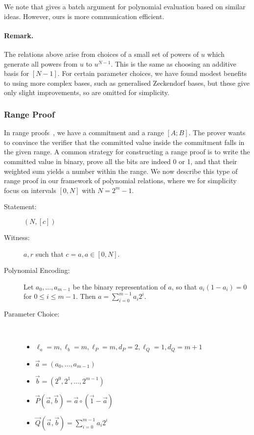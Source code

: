 We note that \cite{Bayer2014} gives a batch argument for polynomial evaluation based on similar ideas. However, ours is more communication efficient.

\paragraph{Remark.} The relations above arise from choices of a small set of powers of $u$ which generate all powers from $u$ to $u^{N-1}$. This is the same as choosing an additive basis for $[N-1]$. For certain parameter choices, we have found modest benefits to using more complex bases, such as generalised Zeckendorf bases, but these give only slight improvements, so are omitted for simplicity.

\subsubsection{Range Proof}\label{app:range}
In range proofs~\cite{Bou02,Lip03}, we have a commitment and a range $[A;B]$. The prover wants to convince the verifier that the committed value inside the commitment falls in the given range. A common strategy for constructing a range proof is to write the committed value in binary, prove all the bits are indeed 0 or 1, and that their weighted sum yields a number within the range. We now describe this type of range proof in our framework of polynomial relations, where we for simplicity focus on intervals $[0,N]$ with $N = 2^{m}-1$.

\begin{description}
\item[ Statement: ] $(N,[c])$
\item[ Witness: ] $a,r$ such that $c = a, a \in [0,N]$.
\item[ Polynomial Encoding: ] Let $a_0,\ldots,a_{m-1}$ be the binary representation of $a$, so that $a_i ( 1 - a_i ) = 0$ for $0 \leq i \leq m-1$. Then $a = \sum_{i=0}^{m-1} a_i 2^i$.
\item[ Parameter Choice: ] \ 
\begin{itemize}
\item $\ell_a=m, \ell_b=m, \ell_P=m, d_P=2, \ell_Q=1, d_Q=m+1$
\item $\vec{a} = (a_0,\ldots,a_{m-1})$
\item $\vec{b} = (2^0,2^1,\ldots,2^{m-1})$
\item $\vec{P}(\vec{a},\vec{b}) = \vec{a} \circ ( \vec{1} - \vec{a} ) $
\item $\vec{Q}(\vec{a},\vec{b}) = \sum_{i=0}^{m-1} a_i 2^i$
\end{itemize}
\end{description}

